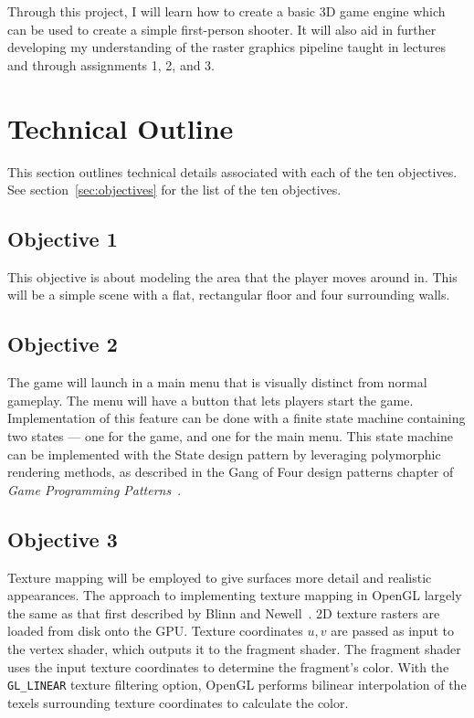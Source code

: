 \documentclass {article}
\begin{document}
Through this project, I will learn how to create a basic 3D game engine which can be used to create a simple first-person shooter. It will also aid in further developing my understanding of the raster graphics pipeline taught in lectures and through assignments 1, 2, and 3.

\newpage
\section{Technical Outline}\label{sec:tech}
This section outlines technical details associated with each of the ten objectives. See section~\ref{sec:objectives} for the list of the ten objectives.

\subsection{Objective 1}
This objective is about modeling the area that the player moves around in. This will be a simple scene with a flat, rectangular floor and four surrounding walls.

\subsection{Objective 2}
The game will launch in a main menu that is visually distinct from normal gameplay. The menu will have a button that lets players start the game. Implementation of this feature can be done with a finite state machine containing two states --- one for the game, and one for the main menu. This state machine can be implemented with the State design pattern by leveraging polymorphic rendering methods, as described in the Gang of Four design patterns chapter of \textit{Game Programming Patterns}~\cite{state}.

\subsection{Objective 3}
Texture mapping will be employed to give surfaces more detail and realistic appearances. The approach to implementing texture mapping in OpenGL largely the same as that first described by Blinn and Newell~\cite{texture}. 2D texture rasters are loaded from disk onto the GPU. Texture coordinates $u, v$ are passed as input to the vertex shader, which outputs it to the fragment shader. The fragment shader uses the input texture coordinates to determine the fragment's color. With the \texttt{GL\_LINEAR} texture filtering option, OpenGL performs bilinear interpolation of the texels surrounding texture coordinates to calculate the color.
\end{document}
